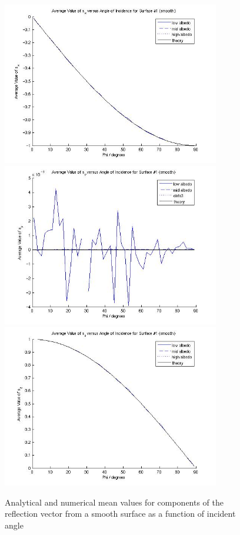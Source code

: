 \begin{description}
      \begin{figure}[!ht]
        \includegraphics[width=95mm]{figs/sda/s_x_smooth.jpg}
        \includegraphics[width=95mm]{figs/sda/s_y_smooth.jpg}
        \includegraphics[width=95mm]{figs/sda/s_z_smooth.jpg}
        \caption{Analytical and numerical mean values for components of
                 the reflection vector from a smooth surface as a
                 function of incident angle}
        \label{fig:ivv_sda_s_vector}
      \end{figure}


\end{description}

